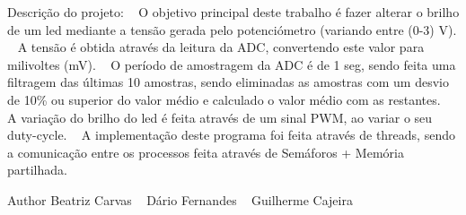 Descrição do projeto\+: ~\newline
O objetivo principal deste trabalho é fazer alterar o brilho de um led mediante a tensão gerada pelo potenciómetro (variando entre (0-\/3) V). ~\newline
A tensão é obtida através da leitura da A\+DC, convertendo este valor para milivoltes (mV). ~\newline
O período de amostragem da A\+DC é de 1 seg, sendo feita uma filtragem das últimas 10 amostras, sendo eliminadas as amostras com um desvio de 10\% ou superior do valor médio e calculado o valor médio com as restantes. ~\newline
A variação do brilho do led é feita através de um sinal P\+WM, ao variar o seu duty-\/cycle. ~\newline
A implementação deste programa foi feita através de threads, sendo a comunicação entre os processos feita através de Semáforos + Memória partilhada.\begin{DoxyAuthor}{Author}
Beatriz Carvas ~\newline
 Dário Fernandes ~\newline
 Guilherme Cajeira 
\end{DoxyAuthor}

